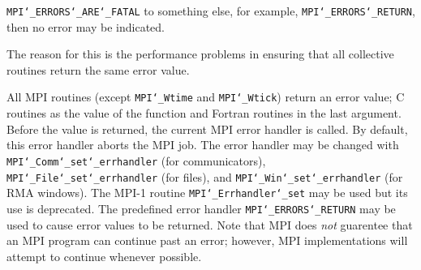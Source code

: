 {\tt MPI{\tt \char`\_}ERRORS{\tt \char`\_}ARE{\tt \char`\_}FATAL} to something else, for example, {\tt MPI{\tt \char`\_}ERRORS{\tt \char`\_}RETURN},
then no error may be indicated.
\par
The reason for this is the performance problems in ensuring that
all collective routines return the same error value.
\par
{}
\par
All MPI routines (except {\tt MPI{\tt \char`\_}Wtime} and {\tt MPI{\tt \char`\_}Wtick}) return an error value;
C routines as the value of the function and Fortran routines in the last
argument.  Before the value is returned, the current MPI error handler is
called.  By default, this error handler aborts the MPI job.  The error handler
may be changed with {\tt MPI{\tt \char`\_}Comm{\tt \char`\_}set{\tt \char`\_}errhandler} (for communicators),
{\tt MPI{\tt \char`\_}File{\tt \char`\_}set{\tt \char`\_}errhandler} (for files), and {\tt MPI{\tt \char`\_}Win{\tt \char`\_}set{\tt \char`\_}errhandler} (for
RMA windows).  The MPI-1 routine {\tt MPI{\tt \char`\_}Errhandler{\tt \char`\_}set} may be used but
its use is deprecated.  The predefined error handler
{\tt MPI{\tt \char`\_}ERRORS{\tt \char`\_}RETURN} may be used to cause error values to be returned.
Note that MPI does {\em not} guarentee that an MPI program can continue past
an error; however, MPI implementations will attempt to continue whenever
possible.
\par
{}
\endmanpage
